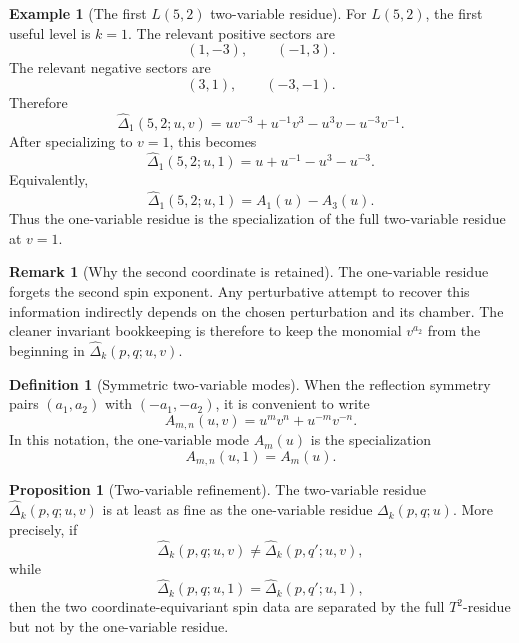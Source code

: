 \documentclass{article}
\theoremstyle{definition}
\newtheorem{definition}[theorem]{Definition}
\newtheorem{proposition}[theorem]{Proposition}
\newtheorem{example}[theorem]{Example}
\newtheorem{remark}[remark]{Remark}
\numberwithin{equation}{section}
\begin{document}
\begin{example}[The first $L(5,2)$ two-variable residue]
For $L(5,2)$, the first useful level is $k=1$.  The relevant positive sectors are
\begin{equation}
(1,-3),
\qquad
(-1,3).
\end{equation}
The relevant negative sectors are
\begin{equation}
(3,1),
\qquad
(-3,-1).
\end{equation}
Therefore
\begin{equation}
\widehat\Delta_1(5,2;u,v)
=
uv^{-3}
+
u^{-1}v^3
-
u^3v
-
u^{-3}v^{-1}.
\end{equation}
After specializing to $v=1$, this becomes
\begin{equation}
\widehat\Delta_1(5,2;u,1)
=
u+
u^{-1}-
u^3-
u^{-3}.
\end{equation}
Equivalently,
\begin{equation}
\widehat\Delta_1(5,2;u,1)
=
A_1(u)-A_3(u).
\end{equation}
Thus the one-variable residue is the specialization of the full two-variable residue at $v=1$.
\end{example}

\begin{remark}[Why the second coordinate is retained]
The one-variable residue forgets the second spin exponent.  Any perturbative attempt to recover this information indirectly depends on the chosen perturbation and its chamber.  The cleaner invariant bookkeeping is therefore to keep the monomial $v^{a_2}$ from the beginning in $\widehat\Delta_k(p,q;u,v)$.
\end{remark}

\begin{definition}[Symmetric two-variable modes]
When the reflection symmetry pairs $(a_1,a_2)$ with $(-a_1,-a_2)$, it is convenient to write
\begin{equation}
A_{m,n}(u,v)
=
u^m v^n
+
u^{-m}v^{-n}.
\end{equation}
In this notation, the one-variable mode $A_m(u)$ is the specialization
\begin{equation}
A_{m,n}(u,1)=A_m(u).
\end{equation}
\end{definition}

\begin{proposition}[Two-variable refinement]
The two-variable residue $\widehat\Delta_k(p,q;u,v)$ is at least as fine as the one-variable residue $\Delta_k(p,q;u)$.  More precisely, if
\begin{equation}
\widehat\Delta_k(p,q;u,v)
\neq
\widehat\Delta_k(p,q';u,v),
\end{equation}
while
\begin{equation}
\widehat\Delta_k(p,q;u,1)
=
\widehat\Delta_k(p,q';u,1),
\end{equation}
then the two coordinate-equivariant spin data are separated by the full $T^2$-residue but not by the one-variable residue.
\end{proposition}
\end{document}
